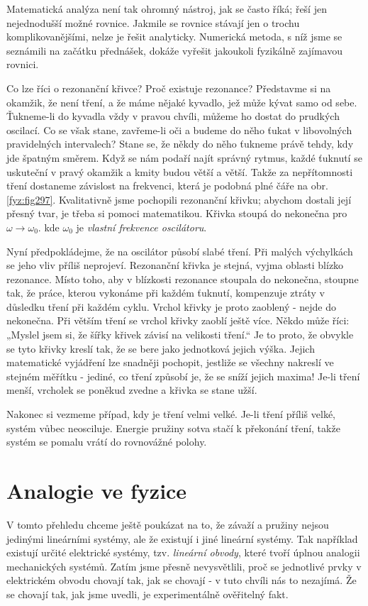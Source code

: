     Matematická analýza není tak ohromný nástroj, jak se často říká; řeší jen nejednodušší možné 
    rovnice. Jakmile se rovnice stávají jen o trochu komplikovanějšími, nelze je řešit analyticky. 
    Numerická metoda, s níž jsme se seznámili na začátku přednášek, dokáže vyřešit jakoukoli 
    fyzikálně zajímavou rovnici.
    
    Co lze říci o rezonanční křivce? Proč existuje rezonance? Představme si na okamžik, že není 
    tření, a že máme nějaké kyvadlo, jež může kývat samo od sebe. Ťukneme-li do kyvadla vždy v 
    pravou chvíli, můžeme ho dostat do prudkých oscilací. Co se však stane, zavřeme-li oči a budeme 
    do něho ťukat v libovolných pravidelných intervalech? Stane se, že někdy do něho ťukneme právě 
    tehdy, kdy jde špatným směrem. Když se nám podaří najít správný rytmus, každé ťuknutí se 
    uskuteční v pravý okamžik a kmity budou větší a větší. Takže za nepřítomnosti tření dostaneme 
    závislost na frekvenci, která je podobná plné čáře na obr. \ref{fyz:fig297}. Kvalitativně jsme 
    pochopili rezonanční křivku; abychom dostali její přesný tvar, je třeba si pomoci matematikou. 
    Křivka stoupá do nekonečna pro \(\omega\rightarrow\omega_0\). kde \(\omega_0\) je \emph{vlastní 
    frekvence oscilátoru}.
    
    Nyní předpokládejme, že na oscilátor působí slabé tření. Při malých výchylkách se jeho vliv 
    příliš neprojeví. Rezonanční křivka je stejná, vyjma oblasti blízko rezonance. Místo toho, aby 
    v blízkosti rezonance stoupala do nekonečna, stoupne tak, že práce, kterou vykonáme při každém 
    ťuknutí, kompenzuje ztráty v důsledku tření při každém cyklu. Vrchol křivky je proto zaoblený - 
    nejde do nekonečna. Při větším tření se vrchol křivky zaoblí ještě více. Někdo může říci: 
    „Myslel jsem si, že šířky křivek závisí na velikosti tření.“ Je to proto, že obvykle se tyto 
    křivky kreslí tak, že se bere jako jednotková jejich výška. Jejich matematické vyjádření lze 
    snadněji pochopit, jestliže se všechny nakreslí ve stejném měřítku - jediné, co tření způsobí 
    je, že se sníží jejich maxima! Je-li tření menší, vrcholek se poněkud zvedne a křivka se stane 
    užší.
    
    Nakonec si vezmeme případ, kdy je tření velmi velké. Je-li tření příliš velké, systém vůbec 
    neosciluje. Energie pružiny sotva stačí k překonání tření, takže systém se pomalu vrátí do 
    rovnovážné polohy.
    
  \section{Analogie ve fyzice}\label{fyz:IchapXXVsecIV}
    V tomto přehledu chceme ještě poukázat na to, že závaží a pružiny nejsou jedinými lineárními 
    systémy, ale že existují i jiné lineární systémy. Tak například existují určité elektrické 
    systémy, tzv. \emph{lineární obvody}, které tvoří úplnou analogii mechanických systémů. Zatím 
    jsme přesně nevysvětlili, proč se jednotlivé prvky v elektrickém obvodu chovají tak, jak se 
    chovají - v tuto chvíli nás to nezajímá. Že se chovají tak, jak jsme uvedli, je experimentálně 
    ověřitelný fakt.
    
